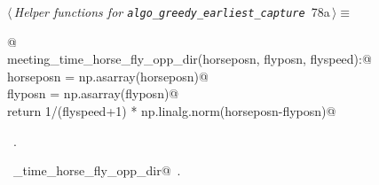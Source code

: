 \documentclass[11.5pt]{report}
\begin{document}
\begin{flushleft} \small
\begin{minipage}{\linewidth}\label{scrap118}\raggedright\small
{} $\langle\,${\itshape Helper functions for \verb|algo_greedy_earliest_capture|}\nobreak\ {\footnotesize {78a}}$\,\rangle\equiv$
\vspace{-1ex}
\begin{list}{}{} \item
\mbox{}\verb@   @\\
\mbox{}\verb@def meeting_time_horse_fly_opp_dir(horseposn, flyposn, flyspeed):@\\
\mbox{}\verb@    horseposn = np.asarray(horseposn)@\\
\mbox{}\verb@    flyposn   = np.asarray(flyposn)@\\
\mbox{}\verb@    return 1/(flyspeed+1) * np.linalg.norm(horseposn-flyposn)@\\
\mbox{}\verb@@{\NWsep}
\end{list}
\vspace{-1.5ex}
\footnotesize
\begin{list}{}{\setlength{\itemsep}{-\parsep}\setlength{\itemindent}{-\leftmargin}}
\item \NWtxtMacroRefIn\ .
\item \NWtxtIdentsDefed\nobreak\  \verb@meeting_time_horse_fly_opp_dir@\nobreak\ .
\item{}
\end{list}
\end{minipage}\vspace{4ex}
\end{flushleft}
\end{document}
